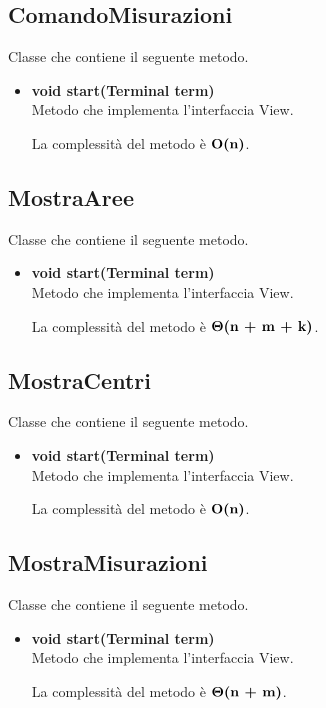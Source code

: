 \documentclass[a4paper, 12pt]{scrreprt}
\begin{document}
			\subsection{ComandoMisurazioni}
			Classe che contiene il seguente metodo.
			\begin{itemize}
				\item \textbf{void start(Terminal term)}
				\\Metodo che implementa l'interfaccia View.
				
				La complessit\`a del metodo \`e $\mathbf{O}\textbf{(n)}$.
				
			\end{itemize}
			
			\subsection{MostraAree}
			Classe che contiene il seguente metodo.
			\begin{itemize}
				\item \textbf{void start(Terminal term)}
				\\Metodo che implementa l'interfaccia View.
				
				La complessit\`a del metodo \`e $\mathbf{\Theta}\textbf{(n + m + k)}$.
				
			\end{itemize}
			
			\subsection{MostraCentri}
			Classe che contiene il seguente metodo.
			\begin{itemize}
				\item \textbf{void start(Terminal term)}
				\\Metodo che implementa l'interfaccia View.
				
				La complessit\`a del metodo \`e $\mathbf{O}\textbf{(n)}$.
				
			\end{itemize}
			
			\subsection{MostraMisurazioni}
			Classe che contiene il seguente metodo.
			\begin{itemize}
				\item \textbf{void start(Terminal term)}
				\\Metodo che implementa l'interfaccia View.
				
				La complessit\`a del metodo \`e $\mathbf{\Theta}\textbf{(n + m)}$.
				
			\end{itemize}
\end{document}
